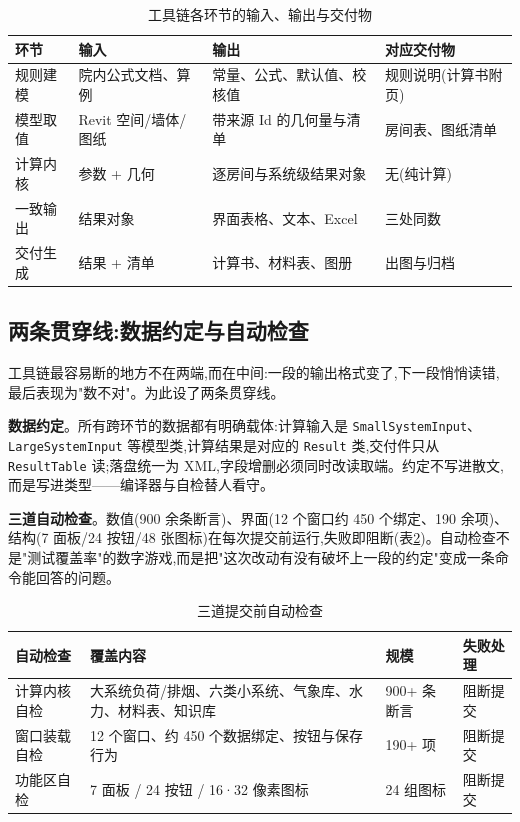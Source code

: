 \documentclass[UTF8,a4paper,zihao=-4]{ctexart}
\begin{document}
\begin{table}[H]
\centering
\caption{工具链各环节的输入、输出与交付物}\label{tab:stages}
\small
\begin{tabular}{p{2.4cm}p{4.6cm}p{4.4cm}p{3.6cm}}
\toprule
环节 & 输入 & 输出 & 对应交付物 \\
\midrule
规则建模 & 院内公式文档、算例 & 常量、公式、默认值、校核值 & 规则说明(计算书附页) \\
模型取值 & Revit 空间/墙体/图纸 & 带来源 Id 的几何量与清单 & 房间表、图纸清单 \\
计算内核 & 参数 + 几何 & 逐房间与系统级结果对象 & 无(纯计算) \\
一致输出 & 结果对象 & 界面表格、文本、Excel & 三处同数 \\
交付生成 & 结果 + 清单 & 计算书、材料表、图册 & 出图与归档 \\
\bottomrule
\end{tabular}
\end{table}

\subsection{两条贯穿线:数据约定与自动检查}

工具链最容易断的地方不在两端,而在中间:一段的输出格式变了,下一段悄悄读错,最后表现为"数不对"。为此设了两条贯穿线。

\textbf{数据约定}。所有跨环节的数据都有明确载体:计算输入是 \texttt{SmallSystemInput}、\texttt{LargeSystemInput} 等模型类,计算结果是对应的 \texttt{Result} 类,交付件只从 \texttt{ResultTable} 读;落盘统一为 XML,字段增删必须同时改读取端。约定不写进散文,而是写进类型——编译器与自检替人看守。

\textbf{三道自动检查}。数值(900 余条断言)、界面(12 个窗口约 450 个绑定、190 余项)、结构(7 面板/24 按钮/48 张图标)在每次提交前运行,失败即阻断(表\ref{tab:gates})。自动检查不是"测试覆盖率"的数字游戏,而是把"这次改动有没有破坏上一段的约定"变成一条命令能回答的问题。

\begin{table}[H]
\centering
\caption{三道提交前自动检查}\label{tab:gates}
\small
\begin{tabular}{p{3.0cm}p{6.2cm}p{3.2cm}p{2.2cm}}
\toprule
自动检查 & 覆盖内容 & 规模 & 失败处理 \\
\midrule
计算内核自检 & 大系统负荷/排烟、六类小系统、气象库、水力、材料表、知识库 & 900+ 条断言 & 阻断提交 \\
窗口装载自检 & 12 个窗口、约 450 个数据绑定、按钮与保存行为 & 190+ 项 & 阻断提交 \\
功能区自检 & 7 面板 / 24 按钮 / 16·32 像素图标 & 24 组图标 & 阻断提交 \\
\bottomrule
\end{tabular}
\end{table}
\end{document}
